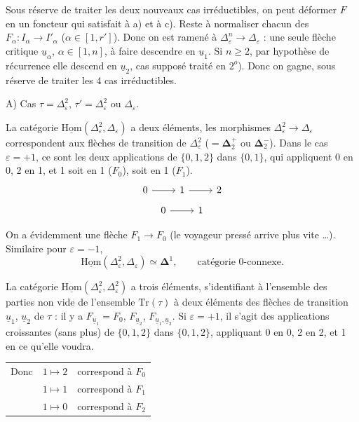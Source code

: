 \documentclass[11pt]{article}
\newcommand{\printedpage}[1]{\marginpar{\footnotesize p.~#1}}
\newcommand{\msp}[1]{\marginpar{\vspace*{10pt}\footnotesize [#1]}}
\newcommand{\uHom}{\underline{\mathrm{Hom}}}
\newcommand{\ul}[1]{\underline{#1}}
\begin{document}
Sous réserve de traiter les deux nouveaux cas irréductibles, on peut déformer $F$ en un foncteur qui satisfait à a) et à c). Reste à normaliser chacun des $F_\alpha:I_\alpha\longrightarrow I'_\alpha$ ($\alpha\in[1,r']$). Donc on est ramené à $\Delta^n_\varepsilon\longrightarrow\Delta_\varepsilon$ : une seule flèche critique $\ul{u}_\alpha$, $\alpha\in[1,n]$, à faire descendre en $\ul{u}_1$. Si $n\geq2$, par hypothèse de récurrence elle descend en $\ul{u}_2$, cas supposé traité en $2^o$). Donc
\msp{page 92}
on gagne, sous réserve de traiter les 4 cas irréductibles.

A) Cas $\tau=\Delta^2_\varepsilon$, $\tau'=\Delta^2_\varepsilon$ ou $\Delta_\varepsilon$.

La catégorie $\uHom(\Delta^2_\varepsilon,\Delta_\varepsilon)$ a deux éléments, les morphismes $\Delta^2_\varepsilon\longrightarrow\Delta_\varepsilon$ correspondent aux flèches de transition de $\Delta^2_\varepsilon$ ($=\mathbf{\Delta}^+_2$ ou $\mathbf{\Delta}^-_2$). Dans le cas $\varepsilon=+1$, ce sont les deux applications de $\{0,1,2\}$ dans $\{0,1\}$, qui appliquent 0 en 0, 2 en 1, et 1 soit en 1 ($F_0$), soit en 1 ($F_1$).
\[
\begin{tikzcd}
0 \arrow[r] & 1 \arrow[r] & 2
\end{tikzcd}
\]
\[
\begin{tikzcd}
0 \arrow[r] & 1
\end{tikzcd}
\]

On a évidemment une flèche $F_1\longrightarrow F_0$ (le voyageur pressé arrive plus vite \ldots). Similaire pour $\varepsilon=-1$,
\[
\uHom(\Delta^2_\varepsilon,\Delta_\varepsilon)\simeq\mathbf{\Delta}^1,\qquad\text{catégorie 0-connexe.}
\]

La catégorie $\uHom(\Delta^2_\varepsilon,\Delta^2_\varepsilon)$ a trois éléments, s'identifiant à l'ensemble des parties non vide de l'ensemble $\mathrm{Tr}(\tau)$ à deux éléments des flèches de transition $\ul{u}_1$, $\ul{u}_2$ de $\tau$ : il y a $F_{\ul{u}_1}=F_0$, $F_{\ul{u}_2}$, $F_{\ul{u}_1,\ul{u}_2}$. Si $\varepsilon=+1$, il s'agit des applications croissantes (sans plus) de $\{0,1,2\}$ dans $\{0,1,2\}$, appliquant 0 en 0, 2 en 2, et 1 en ce qu'elle voudra. %

\printedpage{59}

\begin{tabular}{lll}
Donc & $1\longmapsto 2$ & correspond à \quad $F_0$\\[1ex]
 & $1\longmapsto 1$ & correspond à \quad $F_1$\\[1ex]
 & $1\longmapsto 0$ & correspond à \quad $F_2$
\end{tabular}
\end{document}
